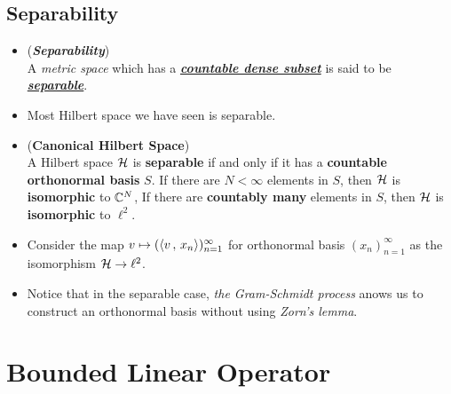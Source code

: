\documentclass[11pt]{article}
\begin{document}
\subsection{Separability}
\begin{itemize}
\item \begin{definition} (\emph{\textbf{Separability}})\\
A \emph{metric space} which has a \underline{\emph{\textbf{countable dense subset}}} is said to be \underline{\emph{\textbf{separable}}}.
\end{definition}

\item \begin{remark}
Most Hilbert space we have seen is separable.
\end{remark}

\item \begin{proposition} (\textbf{Canonical Hilbert Space})\\
A Hilbert space ${\mathcal H}$ is \textbf{separable} if and only if it has a \textbf{countable orthonormal basis} $S$. If there are $N < \infty$ elements in $S$, then ${\mathcal H}$ is
\textbf{isomorphic} to ${\mathbb C}^N$, If there are \textbf{countably many} elements in $S$, then ${\mathcal H}$ is \textbf{isomorphic} to $\ell^{2}$.
\end{proposition}

\item \begin{remark}
Consider the map $v \mapsto (\left\langle v\,,\, x_{n} \right\rangle)_{n=1}^{\infty}$ for orthonormal basis $(x_n)_{n=1}^{\infty}$ as the isomorphism ${\mathcal H} \rightarrow \ell^2$.
\end{remark}

\item \begin{remark}
Notice that in the separable case, \emph{the Gram-Schmidt process} anows us to construct an orthonormal basis without using \emph{Zorn's lemma}.
\end{remark}
\end{itemize}

\section{Bounded Linear Operator}
\end{document}
